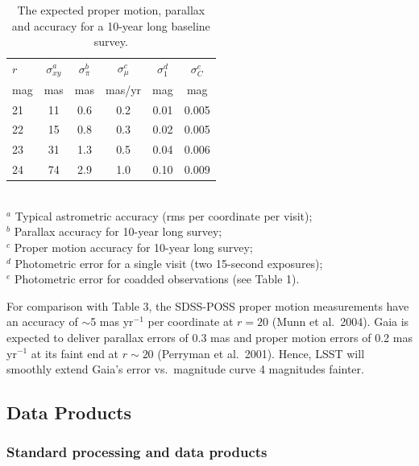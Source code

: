 \documentclass{emulateapj}
\begin{document}
\begin{table}
\caption{The expected proper motion, parallax and accuracy for a 10-year long baseline survey.}
\begin{tabular}{|l|c|c|c|c|c|}
\hline  
    $r$   &  $\sigma^a_{xy} $  & $\sigma^b_\pi$  &   $\sigma^c_\mu$   &  $\sigma^d_1$  &  $\sigma^e_C$  \\
    mag &       mas            &      mas  & mas/yr &   mag   &    mag  \\
\hline  
       21 &  11  &  0.6  &  0.2   &   0.01  &   0.005 \\
       22 &  15  &  0.8  &  0.3   &   0.02  &   0.005 \\
       23 &  31  &  1.3  &  0.5   &   0.04  &   0.006 \\
       24 &  74  &  2.9  &  1.0   &   0.10  &   0.009 \\
\hline                         
\end{tabular}
\\ \vskip 0.05in
  $^a$ Typical astrometric accuracy (rms per coordinate per visit); \\
  $^b$ Parallax accuracy for 10-year long survey; \\
  $^c$ Proper motion accuracy for 10-year long survey; \\
  $^d$ Photometric error for a single visit (two 15-second exposures); \\
  $^e$ Photometric error for coadded observations (see Table 1). \\
\end{table}



For comparison with Table 3, the SDSS-POSS proper motion measurements have an 
accuracy of $\sim$5 mas yr$^{-1}$ per coordinate at $r=20$ (Munn et al.~2004). Gaia
is expected to deliver parallax errors of 0.3 mas and proper motion errors of 
0.2 mas yr$^{-1}$ at its faint end at $r\sim20$ (Perryman et al.~2001). Hence, LSST will smoothly 
extend Gaia's error vs.\ magnitude curve 4 magnitudes fainter.



\subsection{             Data Products                    } 

\subsubsection{ Standard processing and data products}
\end{document}
